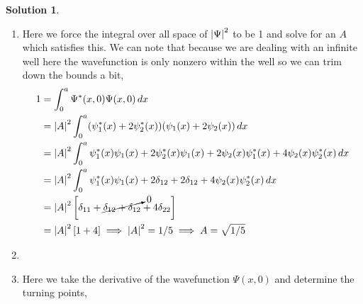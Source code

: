 \documentclass[10pt]{article}
\theoremstyle{definition}
\newtheorem{soln}{Solution}
\begin{document}
\begin{soln}~
  \begin{enumerate}[label=(\alph*)]
    \item Here we force the integral over all space of $\abs{\Psi}^2$ to be 1 and solve for an $A$ which satisfies this. We can note
          that because we are dealing with an infinite well here the wavefunction is only nonzero within the well so we can trim down the bounds a bit,
          \begin{align*}
            1 & =\int_{0}^{a}\Psi^*(x,0)\Psi(x,0)\,dx                                                                            \\
              & =\abs{A}^2\int_{0}^{a}(\psi_1^*(x)+2\psi_2^*(x))(\psi_1(x)+2\psi_2(x))\,dx                                       \\
              & =\abs{A}^2\int_{0}^{a}\psi_1^*(x)\psi_1(x)+2\psi_2^*(x)\psi_1(x)+2\psi_2(x)\psi_1^*(x)+4\psi_2(x)\psi_2^*(x)\,dx \\
              & =\abs{A}^2\int_{0}^{a}\psi_1^*(x)\psi_1(x)+2\delta_{12}+2\delta_{12}+4\psi_2(x)\psi_2^*(x)\,dx                   \\
              & =\abs{A}^2\left[\delta_{11}+\cancelto{0}{\delta_{12}+\delta_{12}}+4\delta_{22}\right]                            \\
              & =\abs{A}^2\left[1+4\right]\implies \abs{A}^2=1/5\implies A=\sqrt{1/5}
          \end{align*}
    \item ~\\
          \begin{center}
          \end{center}
    \item Here we take the derivative of the wavefunction $\Psi(x,0)$ and determine the turning points,

\end{enumerate}
\end{soln}
\end{document}
